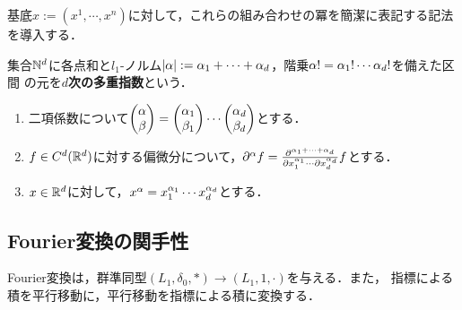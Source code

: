 \documentclass[uplatex,dvipdfmx]{jsreport}
\begin{document}
\begin{tcolorbox}[colframe=ForestGreen, colback=ForestGreen!10!white,breakable,colbacktitle=ForestGreen!40!white,coltitle=black,fonttitle=\bfseries\sffamily,
    title=]
    基底$x:=(x^1,\cdots,x^n)$に対して，これらの組み合わせの冪を簡潔に表記する記法を導入する．
\end{tcolorbox}

\begin{definition}
    集合$\mathbb{N}^d$に各点和と$l_1$-ノルム$\lvert\alpha\rvert:=\alpha_1+\cdots+\alpha_d$，階乗$\alpha!=\alpha_1!\cdots\alpha_d!$を備えた区間
    の元を\textbf{$d$次の多重指数}という．
    \begin{enumerate}
        \item 二項係数について$\begin{pmatrix}\alpha\\\beta\end{pmatrix}=\begin{pmatrix}\alpha_1\\\beta_1\end{pmatrix}\cdots\begin{pmatrix}\alpha_d\\\beta_d\end{pmatrix}$とする．
        \item $f\in C^d(\mathbb{R}^d)$に対する偏微分について，$\partial^\alpha f=\frac{\partial^{\alpha_1+\cdots+\alpha_d}}{\partial x_1^{\alpha_1}\cdots\partial x_d^{\alpha_d}}f$とする．
        \item $x\in\mathbb{R}^d$に対して，$x^\alpha=x_1^{\alpha_1}\cdots x_d^{\alpha_d}$とする．
    \end{enumerate}
\end{definition}

\subsection{Fourier変換の関手性}

\begin{tcolorbox}[colframe=ForestGreen, colback=ForestGreen!10!white,breakable,colbacktitle=ForestGreen!40!white,coltitle=black,fonttitle=\bfseries\sffamily,
title=]
    Fourier変換は，群準同型$(L_1,\delta_0,*)\to(L_1,1,\cdot)$を与える．また，
    指標による積を平行移動に，平行移動を指標による積に変換する．
\end{tcolorbox}
\end{document}
